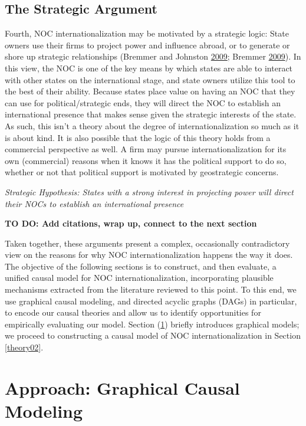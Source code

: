 \documentclass[11pt,]{book}
\begin{document}
\hypertarget{the-strategic-argument}{%
\subsection{The Strategic Argument}\label{the-strategic-argument}}

Fourth, NOC internationalization may be motivated by a strategic logic: State owners use their firms to project power and influence abroad, or to generate or shore up strategic relationships (Bremmer and Johnston \protect\hyperlink{ref-bremmer_rise_2009}{2009}; Bremmer \protect\hyperlink{ref-bremmer_state_2009}{2009}). In this view, the NOC is one of the key means by which states are able to interact with other states on the international stage, and state owners utilize this tool to the best of their ability. Because states place value on having an NOC that they can use for political/strategic ends, they will direct the NOC to establish an international presence that makes sense given the strategic interests of the state. As such, this isn't a theory about the degree of internationalization so much as it is about kind. It is also possible that the logic of this theory holds from a commercial perspective as well. A firm may pursue internationalization for its own (commercial) reasons when it knows it has the political support to do so, whether or not that political support is motivated by geostrategic concerns.

\emph{Strategic Hypothesis: States with a strong interest in projecting power will direct their NOCs to establish an international presence}

\textbf{TO DO: Add citations, wrap up, connect to the next section}

Taken together, these arguments present a complex, occasionally contradictory view on the reasons for why NOC internationalization happens the way it does. The objective of the following sections is to construct, and then evaluate, a unified causal model for NOC internationalization, incorporating plausible mechanisms extracted from the literature reviewed to this point. To this end, we use graphical causal modeling, and directed acyclic graphs (DAGs) in particular, to encode our causal theories and allow us to identify opportunities for empirically evaluating our model. Section (\ref{approach02}) briefly introduces graphical models; we proceed to constructing a causal model of NOC internationalization in Section \ref{theory02}.

\hypertarget{approach02}{%
\section{Approach: Graphical Causal Modeling}\label{approach02}}
\end{document}
